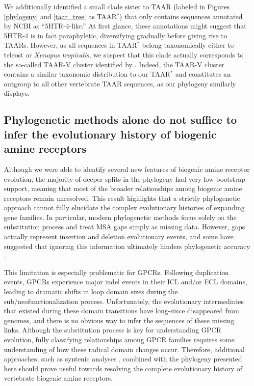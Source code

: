 \documentclass[fleqn,10pt]{wlpeerj}
\begin{document}
We additionally identified a small clade sister to TAAR (labeled in Figures \ref{phylogeny} and \ref{taar_tree} as TAAR$^\ast$) that only contains sequences annotated by NCBI as ``5HTR-4-like.'' At first glance, these annotations might suggest that 5HTR-4 is in fact paraphyletic, diversifying gradually before giving rise to TAARs. However, as all sequences in TAAR$^\ast$ belong taxonomically either to teleost or \emph{Xenopus tropicalis}, we suspect that this clade actually corresponds to the so-called TAAR-V cluster identified by \cite{Hashiguchi2007}. Indeed, the TAAR-V cluster contains a similar taxonomic distribution to our TAAR$^\ast$ and constitutes an outgroup to all other vertebrate TAAR sequences, as our phylogeny similarly displays. 

\subsection*{Phylogenetic methods alone do not suffice to infer the evolutionary history of biogenic amine receptors}
Although we were able to identify several new features of biogenic amine receptor evolution, the majority of deeper splits in the phylogeny had very low bootstrap support, meaning that most of the broader relationships among biogenic amine receptors remain unresolved. This result highlights that a strictly phylogenetic approach cannot fully elucidate the complex evolutionary histories of expanding gene families. In particular, modern phylogenetic methods focus solely on the substitution process and treat MSA gaps simply as missing data. However, gaps actually represent insertion and deletion evolutionary events, and some have suggested that ignoring this information ultimately hinders phylogenetic accuracy \citep{Morrison2008,Loytynoja2008,Warnow2012,Luanetal2013}. 

This limitation is especially problematic for GPCRs. Following duplication events, GPCRs experience major indel events in their ICL and/or ECL domains, leading to dramatic shifts in loop domain sizes during the sub/neofunctionalization process. Unfortunately, the evolutionary intermediates that existed during these domain transitions have long-since disappeared from genomes, and there is no obvious way to infer the sequences of these missing links. Although the substitution process is key for understanding GPCR evolution, fully classifying relationships among GPCR families requires some understanding of how these radical domain changes occur. Therefore, additional approaches, such as syntenic analyses \citep{Sundstrom2010,Widmark2011,YegorovGood2012,Hwangetal2013}, combined with the phylogeny presented here should prove useful towards resolving the complete evolutionary history of vertebrate biogenic amine receptors. 
\end{document}
